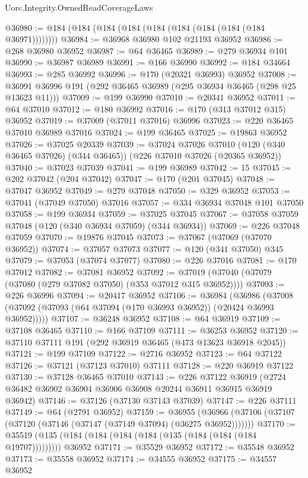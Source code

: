 \begin{lexlean}{Uorc.Integrity.OwnedReadCoverageLaws}
\begin{coremodule}
@36980 := @184 (@184 (@184 (@184 (@184 (@184 (@184 (@184 (@184 @36971))))))))
@36984 := @36968 @36980 @102 @21193 @36952
@36986 := @268 @36980 @36952
@36987 := @64 @36465
@36989 := @279 @36934 @101
@36990 := @36987 @36989
@36991 := @166 @36990
@36992 := @184 @34664
@36993 := @285 @36992
@36996 := @170 (@20321 @36993) @36952
@37008 := @36991 @36996 @191 (@292 @36465 @36989 (@295 @36934 @36465 (@298 @25 @13623 @11)))
@37009 := @199 @36990
@37010 := @20341 @36952
@37011 := @64 @37010
@37012 := @180 @36992
@37016 := @170 (@313 @37012 @315) @36952
@37019 := @37009 (@37011 @37016) @36996
@37023 := @220 @36465 @37010 @36989 @37016
@37024 := @199 @36465
@37025 := @19863 @36952
@37026 := @37025 @20339
@37039 := @37024
    @37026
    @37010
    (@120 (@340 @36465 @37026) (@344 @36465))
    (@226 @37010 @37026 (@20365 @36952))
@37040 := @37023 @37039
@37041 := @199 @36989
@37042 := 15
@37045 := @202 @37042 (@204 @37042)
@37047 := @170 (@201 @37045)
@37048 := @37047 @36952
@37049 := @279 @37048
@37050 := @329 @36952
@37053 := @37041 (@37049 @37050) @37016
@37057 := @334 @36934 @37048 @101 @37050
@37058 := @199 @36934
@37059 := @37025 @37045
@37067 := @37058 @37059 @37048 (@120 (@340 @36934 @37059) (@344 @36934))
@37069 := @226 @37048 @37059
@37070 := @19876 @37045
@37073 := @37067 (@37069 (@37070 @36952))
@37074 := @37057 @37073
@37077 := @120 (@341 @37050) @345
@37079 := @37053 (@37074 @37077)
@37080 := @226 @37016
@37081 := @170 @37012
@37082 := @37081 @36952
@37092 := @37019 (@37040 (@37079 (@37080 (@279 @37082 @37050) (@353 @37012 @315 @36952))))
@37093 := @226 @36996
@37094 := @20417 @36952
@37106 := @36984
    (@36986 (@37008 (@37092 (@37093 (@64 @37094 (@170 @36993 @36952)) (@20424 @36993 @36952)))))
@37107 := @36248 @36952
@37108 := @64 @36919
@37109 := @37108 @36465
@37110 := @166 @37109
@37111 := @36253 @36952
@37120 := @37110 @37111 @191 (@292 @36919 @36465 (@473 @13623 @36918 @2045))
@37121 := @199 @37109
@37122 := @2716 @36952
@37123 := @64 @37122
@37126 := @37121 (@37123 @37010) @37111
@37128 := @220 @36919 @37122
@37130 := @37128 @36465 @37010
@37143 := @226
    @37122
    @36919
    (@2724 @36482 @36902 @36904 @36906 @36908 @20244 @36911 @36915 @36919 @36942)
@37146 := @37126 (@37130 @37143 @37039)
@37147 := @226 @37111
@37149 := @64 (@2791 @36952)
@37159 := @36955
    (@36966 (@37106 (@37107 (@37120 (@37146 (@37147 (@37149 @37094) (@36275 @36952)))))))
@37170 := @35519 (@135 (@184 (@184 (@184 (@184 (@135 (@184 (@184 (@184 @19707))))))))) @36952
@37171 := @35529 @36952
@37172 := @35548 @36952
@37173 := @35558 @36952
@37174 := @34555 @36952
@37175 := @34557 @36952

\end{coremodule}
\end{lexlean}
